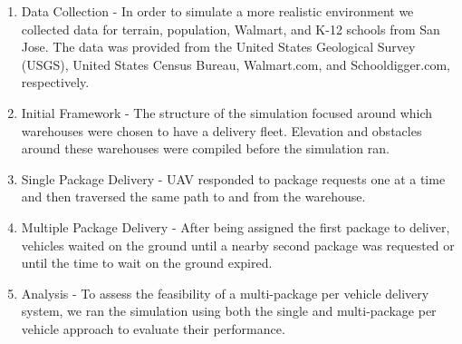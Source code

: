 \justify
\begin{enumerate}
\item{Data Collection - In order to simulate a more realistic environment we collected data for terrain, population, Walmart, and K-12 schools from San Jose. The data was provided from the United States Geological Survey (USGS), United States Census Bureau, Walmart.com, and Schooldigger.com, respectively.}\\

\vspace{7mm}

\item{Initial Framework - The structure of the simulation focused around which warehouses were chosen to have a delivery fleet. Elevation and obstacles around these warehouses were compiled before the simulation ran.}

\vspace{7mm}

\item{Single Package Delivery - UAV responded to package requests one at a time and then traversed the same path to and from the warehouse.}

\vspace{7mm}

\item{Multiple Package Delivery - After being assigned the first package to deliver, vehicles waited on the ground until a nearby second package was requested or until the time to wait on the ground expired.}

\vspace{7mm}

\item{Analysis - To assess the feasibility of a multi-package per vehicle delivery system, we ran the simulation using both the single and multi-package per vehicle approach to evaluate their performance.}
\end{enumerate}
